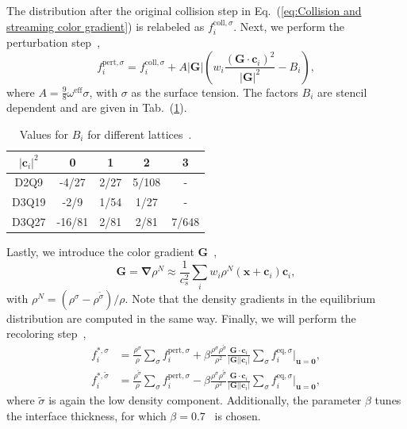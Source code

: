 \documentclass[aps,physrev,twocolumn,10pt]{revtex4-2}
\begin{document}
The distribution after the original collision step in Eq.~(\ref{eq:Collision and streaming color gradient}) is relabeled as $f_i^{\text{coll},\sigma}$. Next, we perform the perturbation step~\cite{leclaire_generalized_2017},
\begin{equation}
    f_i^{\text{pert}, \sigma} = f_i^{\text{coll},\sigma} + A|\bm{G}|\left(w_i\frac{{\left(\bm{G}\cdot\bm{c}_i\right)}^2}{|\bm{G}|^2} - B_i\right),
\end{equation}
where $A = \frac{9}{8}\omega^\text{eff}\sigma$, with $\sigma$ as the surface tension. The factors $B_i$ are stencil dependent and are given in Tab.~(\ref{tab:B_i}).
\begin{table}[htp]
\centering
\begin{tabular}{| c | c c c c |} 
    \hline
    $|\bm{c}_i|^2$& 0 & 1 & 2 & 3 \\ 
    \hline
    D2Q9 & -4/27 & 2/27 & 5/108& - \\
    D3Q19 & -2/9 & 1/54 & 1/27& - \\
    D3Q27 & -16/81 & 2/81 & 2/81 & 7/648\\
    \hline
\end{tabular}
\caption{Values for $B_i$ for different lattices~\cite{leclaire_generalized_2017}.}\label{tab:B_i}
\end{table}

\noindent Lastly, we introduce the color gradient $\bm{G}$~\cite{leclaire_generalized_2017},
\begin{equation}\label{eq:Color-Gradient}
    \bm{G} = \bm{\nabla}\rho^N \approx \frac{1}{c_s^2}\sum_i w_i \rho^N(\bm{x} + \bm{c}_i) \bm{c}_i,
\end{equation}
with $\rho^N = \left(\rho^\sigma - \rho^{\tilde{\sigma}}\right)/{\rho}$. Note that the density gradients in the equilibrium distribution are computed in the same way. Finally, we will perform the recoloring step~\cite{leclaire_numerical_2012},
\begin{equation}
\begin{split}
    f_i^{*,\sigma} &= \frac{\rho^\sigma}{\rho}\sum_\sigma f^{\text{pert},\sigma}_i + \beta \frac{\rho^\sigma \rho^{\tilde{\sigma}}}{\rho^2}\frac{\bm{G}\cdot \bm{c}_i}{|\bm{G}||\bm{c}_i|}\sum_\sigma f^{\text{eq},\sigma}_i|_{\bm{u}=\bm{0}},\\
    f_i^{*,\tilde{\sigma}} &= \frac{\rho^{\tilde{\sigma}}}{\rho}\sum_\sigma f^{\text{pert},\sigma}_i - \beta \frac{\rho^\sigma \rho^{\tilde{\sigma}}}{\rho^2}\frac{\bm{G}\cdot \bm{c}_i}{|\bm{G}||\bm{c}_i|}\sum_\sigma f^{\text{eq},\sigma}_i|_{\bm{u}=\bm{0}},
\end{split}
\end{equation}
where $\tilde{\sigma}$ is again the low density component. Additionally, the parameter $\beta$ tunes the interface thickness, for which $\beta = 0.7$~\cite{datadien_directional_2024} is chosen. 
\end{document}
